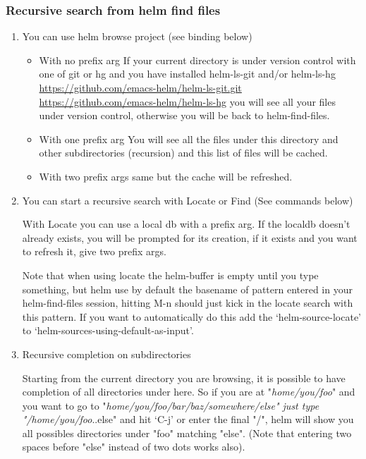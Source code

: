\documentclass[11pt]{article}
\begin{document}
\subsubsection{Recursive search from helm find files}
\label{sec:org7340168}

\begin{enumerate}
\item You can use helm browse project (see binding below)
\label{sec:org72a5663}

\begin{itemize}
\item With no prefix arg
If your current directory is under version control
with one of git or hg and you have installed helm-ls-git and/or helm-ls-hg
\url{https://github.com/emacs-helm/helm-ls-git.git}
\url{https://github.com/emacs-helm/helm-ls-hg}
you will see all your files under version control, otherwise
you will be back to helm-find-files.
\item With one prefix arg
You will see all the files under this directory
and other subdirectories (recursion) and this list of files will be cached.
\item With two prefix args
same but the cache will be refreshed.
\end{itemize}

\item You can start a recursive search with Locate or Find (See commands below)
\label{sec:org7eadaab}

With Locate you can use a local db with a prefix arg. If the localdb doesn’t already
exists, you will be prompted for its creation, if it exists and you want to refresh it,
give two prefix args.

Note that when using locate the helm-buffer is empty until you type something,
but helm use by default the basename of pattern entered in your helm-find-files session,
hitting M-n should just kick in the locate search with this pattern.
If you want to automatically do this add the ‘helm-source-locate’
to ‘helm-sources-using-default-as-input’.

\item Recursive completion on subdirectories
\label{sec:orgac2bf55}

Starting from the current directory you are browsing, it is possible
to have completion of all directories under here.
So if you are at "\emph{home/you/foo}" and you want to go to "\emph{home/you/foo/bar/baz/somewhere/else"
just type "/home/you/foo}..else" and hit ‘C-j’ or enter the final "/", helm will show you all
possibles directories under "foo" matching "else".
(Note that entering two spaces before "else" instead of two dots works also).


\end{enumerate}
\end{document}
